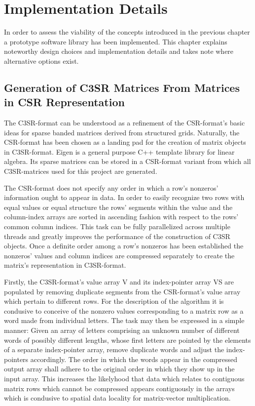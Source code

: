 \def\ApiHubMlf{http://eigen.tuxfamily.org/index.php?title=Main_Page}

\chapter{Implementation Details}

  In order to assess the viability of the concepts introduced in the previous chapter a prototype software library has
  been implemented. This chapter explains noteworthy design choices and implementation details and takes note where
  alternative options exist.

  \section{Generation of C3SR Matrices From Matrices in CSR Representation} \label{sec:gen-of-c3sr-from-csr}

    The C3SR-format can be understood as a refinement of the CSR-format's basic ideas for sparse banded matrices derived
    from structured grids. Naturally, the CSR-format has been chosen as a landing pad for the creation of matrix objects
    in C3SR-format. Eigen \cite{eigen:website} is a general purpose C++ template library for linear algebra. Its sparse
    matrices can be stored in a CSR-format variant from which all C3SR-matrices used for this project are generated.

    The CSR-format does not specify any order in which a row's nonzeros' information ought to appear in data. In order
    to easily recognize two rows with equal values or equal structure the rows' segments within the value and the
    column-index arrays are sorted in ascending fashion with respect to the rows' common column indices. This task can
    be fully parallelized across multiple threads and greatly improves the performance of the construction of C3SR
    objects. Once a definite order among a row's nonzeros has been established the nonzeros' values and column indices
    are compressed separately to create the matrix's representation in C3SR-format.

    Firstly, the C3SR-format's value array V and its index-pointer array VS are populated by removing duplicate segments
    from the CSR-format's value array which pertain to different rows. For the description of the algorithm it is
    condusive to conceive of the nonzero values corresponding to a matrix row as a word made from individual letters.
    The task may then be expressed in a simple manner: Given an array of letters comprising an unknown number of
    different words of possibly different lengths, whose first letters are pointed by the elements of a separate
    index-pointer array, remove duplicate words and adjust the index-pointers accordingly. The order in which the words
    appear in the compressed output array shall adhere to the original order in which they show up in the input array.
    This increases the likelyhood that data which relates to contiguous matrix rows which cannot be compressed appears
    contiguously in the arrays which is condusive to spatial data locality for matrix-vector multiplication.

